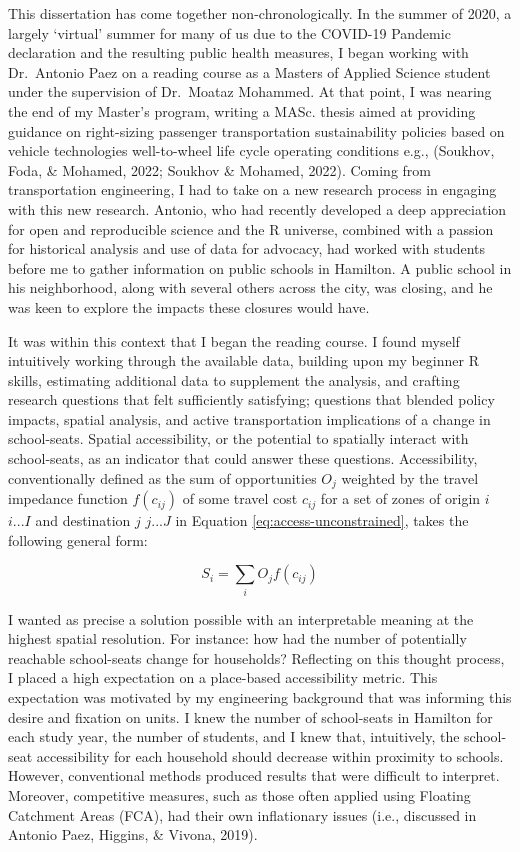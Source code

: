 \documentclass[
11pt, %
oneside, %
english, %
singlespacing, %
]{macthesis} %
\begin{document}
This dissertation has come together non-chronologically. In the summer of 2020, a largely `virtual' summer for many of us due to the COVID-19 Pandemic declaration and the resulting public health measures, I began working with Dr.~Antonio Paez on a reading course as a Masters of Applied Science student under the supervision of Dr.~Moataz Mohammed. At that point, I was nearing the end of my Master's program, writing a MASc. thesis aimed at providing guidance on right-sizing passenger transportation sustainability policies based on vehicle technologies well-to-wheel life cycle operating conditions e.g., (Soukhov, Foda, \& Mohamed, 2022; Soukhov \& Mohamed, 2022). Coming from transportation engineering, I had to take on a new research process in engaging with this new research. Antonio, who had recently developed a deep appreciation for open and reproducible science and the R universe, combined with a passion for historical analysis and use of data for advocacy, had worked with students before me to gather information on public schools in Hamilton. A public school in his neighborhood, along with several others across the city, was closing, and he was keen to explore the impacts these closures would have.

It was within this context that I began the reading course. I found myself intuitively working through the available data, building upon my beginner R skills, estimating additional data to supplement the analysis, and crafting research questions that felt sufficiently satisfying; questions that blended policy impacts, spatial analysis, and active transportation implications of a change in school-seats. Spatial accessibility, or the potential to spatially interact with school-seats, as an indicator that could answer these questions. Accessibility, conventionally defined as the sum of opportunities \(O_j\) weighted by the travel impedance function \(f(c_{ij})\) of some travel cost \(c_{ij}\) for a set of zones of origin \(i\) \(i...I\) and destination \(j\) \(j...J\) in Equation \ref{eq:access-unconstrained}, takes the following general form:

\begin{equation}
\label{eq:access-unconstrained}
S_i = \sum_i O_j f(c_{ij}) 
\end{equation} 

I wanted as precise a solution possible with an interpretable meaning at the highest spatial resolution. For instance: how had the number of potentially reachable school-seats change for households? Reflecting on this thought process, I placed a high expectation on a place-based accessibility metric. This expectation was motivated by my engineering background that was informing this desire and fixation on units. I knew the number of school-seats in Hamilton for each study year, the number of students, and I knew that, intuitively, the school-seat accessibility for each household should decrease within proximity to schools. However, conventional methods produced results that were difficult to interpret. Moreover, competitive measures, such as those often applied using Floating Catchment Areas (FCA), had their own inflationary issues (i.e., discussed in Antonio Paez, Higgins, \& Vivona, 2019).
\end{document}
